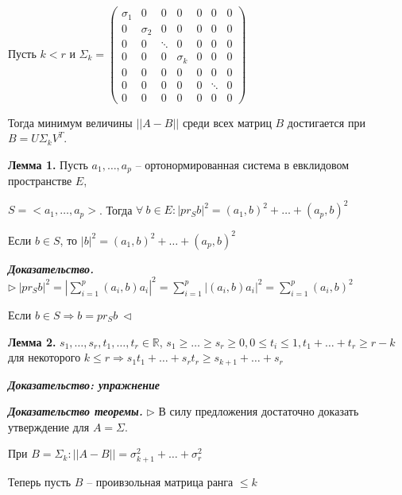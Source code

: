 Пусть $k < r$ и $\Sigma_k = \begin{pmatrix} \sigma_1 & 0 & 0 & 0 & 0 & 0 & 0 \\  0 & \sigma_2 & 0 & 0 & 0 & 0 & 0 \\ 0 & 0 & \ddots & 0 & 0 & 0 & 0 \\ 0 & 0 & 0 & \sigma_k & 0 & 0 & 0 \\ 0 & 0 & 0 & 0 & 0 & 0 & 0 \\ 0 & 0 & 0 & 0 & 0 & \ddots & 0 \\ 0 & 0 & 0 & 0 & 0 & 0 & 0 \end{pmatrix}$

Тогда минимум величины $||A - B||$ среди всех матриц $B$ достигается при $B = U \Sigma_k V^T$.

\vspace{\baselineskip}
\textbf{Лемма 1.} Пусть $a_1, \dots, a_p$ -- ортонормированная система в евклидовом пространстве $E$,

$S = <a_1, \dots, a_p>$. Тогда $\forall \ b \in E: |pr_S b|^2 = (a_1, b)^2 + \dots + (a_p, b)^2$

Если $b \in S$, то $|b|^2 = (a_1, b)^2 + \dots + (a_p, b)^2$

\vspace{\baselineskip}
\textbf{\textit{Доказательство.}} $\rhd \ |pr_S b|^2 = |\sum\limits_{i=1}^p (a_i, b) a_i|^2 = \sum\limits_{i=1}^p |(a_i, b) a_i|^2 = \sum\limits_{i=1}^p (a_i, b)^2$

Если $b \in S \Rightarrow b = pr_S b \ \lhd$

\vspace{\baselineskip}
\textbf{Лемма 2.} $s_1, \dots, s_r, t_1, \dots, t_r \in \mathbb{R}$, $s_1 \geqslant \dots \geqslant s_r \geqslant 0, 0 \leqslant t_i \leqslant 1, t_1 + \dots + t_r \geqslant r - k$ для некоторого $k \leqslant r \Rightarrow s_1 t_1 + \dots + s_r t_r \geqslant s_{k+1} + \dots + s_r$

\vspace{\baselineskip}
\textbf{\textit{Доказательство: упражнение}}

\vspace{\baselineskip}
\textbf{\textit{Доказательство теоремы.}} $\rhd$ В силу предложения достаточно доказать утверждение для $A = \Sigma$.

При $B = \Sigma_k: ||A - B|| = \sigma_{k+1}^2 + \dots + \sigma_r^2$

\vspace{\baselineskip}
Теперь пусть $B$ -- проивзольная матрица ранга $\leqslant k$

